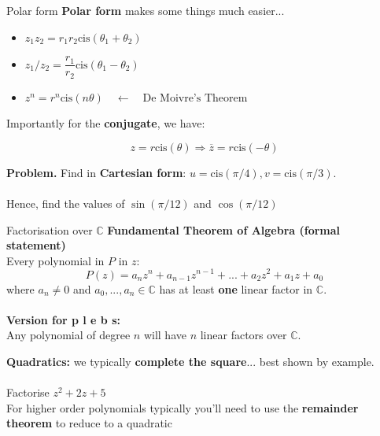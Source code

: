 \documentclass{beamer}
\begin{document}
\begin{frame}{Polar form}
	\textbf{Polar form} makes some things much easier...
	\begin{itemize}
		\item $z_1 z_2 = r_1 r_2 \mathrm{cis}(\theta_1 + \theta_2)$
		\item $z_1/z_2 = \dfrac{r_1}{r_2}\mathrm{cis}(\theta_1 - \theta_2)$
		\item $z^n = r^n \mathrm{cis}(n\theta) \quad \leftarrow \quad \text{De Moivre's Theorem}$
	\end{itemize}
	
	Importantly for the \textbf{conjugate}, we have:
	
	$$z = r\mathrm{cis}(\theta) \Rightarrow \overline{z} = r\mathrm{cis}(-\theta)$$
\end{frame}

\begin{frame}
	\textbf{Problem.} Find in \textbf{Cartesian form}: $u = \mathrm{cis}(\pi/4), v = \mathrm{cis}(\pi/3)$.\\~\\
	Hence, find the values of $\sin(\pi/12)$ and $\cos(\pi/12)$
	\vspace{5cm}
\end{frame}

\begin{frame}{Factorisation over $\mathbb{C}$}
	\textbf{Fundamental Theorem of Algebra (formal statement)}\\
	Every polynomial in $P$ in $z$:
	$$P(z) = a_n z^n + a_{n-1}z^{n-1} + ... + a_2 z^2 + a_1 z + a_0$$
	where $a_n \ne 0$ and $a_0, ..., a_n \in \mathbb{C}$ has at least \textbf{one} linear factor in $\mathbb{C}$.
	\\~\\
	\textbf{Version for p l e b s:}\\
	Any polynomial of degree $n$ will have $n$ linear factors over $\mathbb{C}$.
\end{frame}

\begin{frame}
	\textbf{Quadratics: } we typically \textbf{complete the square}... best shown by example.
	\\~\\
	Factorise $z^2 + 2z + 5$
	\vspace{5cm}
	\\
	For higher order polynomials typically you'll need to use the \textbf{remainder theorem} to reduce to a quadratic
\end{frame}
\end{document}
